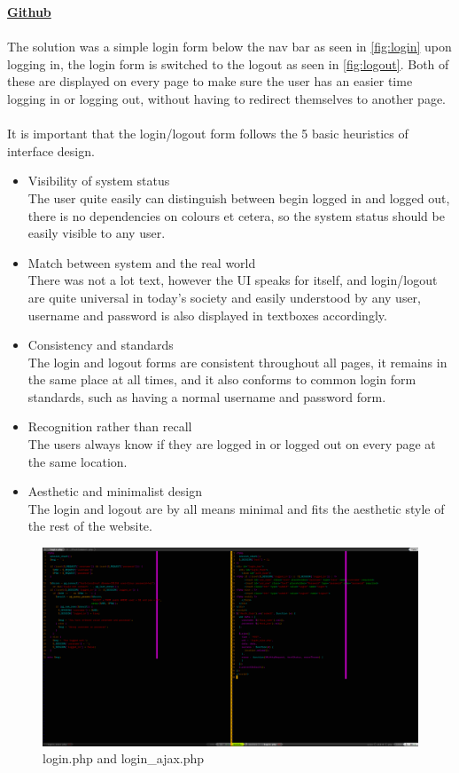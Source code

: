 \documentclass[a4paper]{scrartcl}
\begin{document}
\textbf{\href{https://github.com/linus-dev/KTH-Projects/tree/master/ID1354/2}{Github}}\\\\

\noindent
The solution was a simple login form below the nav bar as
seen in \ref{fig:login} upon logging in, the login form is
switched to the logout as seen in \ref{fig:logout}. Both
of these are displayed on every page to make sure the
user has an easier time logging in or logging out, without
having to redirect themselves to another page.
\\\\
It is important that the login/logout form follows the 5 basic heuristics of
interface design.
\begin{itemize}
\item{Visibility of system status}\\
  The user quite easily can distinguish between begin logged in and logged out,
  there is no dependencies on colours et cetera, so the system status should be
  easily visible to any user.
\item{Match between system and the real world}\\
  There was not a lot text, however the UI speaks for itself, and login/logout
  are quite universal in today's society and easily understood by any user, username and password is also displayed in
  textboxes accordingly.
\item{Consistency and standards}\\
  The login and logout forms are consistent throughout all pages, it remains in
  the same place at all times, and it also conforms to common login form standards,
  such as having a normal username and password form.
\item{Recognition rather than recall}\\
  The users always know if they are logged in or logged out on every page at the same
  location.
\item{Aesthetic and minimalist design}\\
  The login and logout are by all means minimal and fits the aesthetic style of the rest of the website.
\end{itemize}

\begin{figure}[H]
  \begin{center}
    \includegraphics[scale=0.32]{images/login_code.png}
    \caption{login.php and login\_ajax.php}
    \label{fig:login_code}
  \end{center}
\end{figure}
\end{document}
